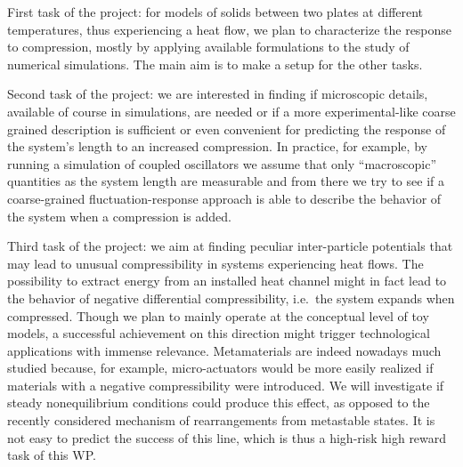 \begin{workpackage}
\begin{wpdescription}
\end{wpdescription}

\begin{tasklist}

  \begin{task}[title=TASK1,id=task1,PM=15,lead=Padova,wphases=0-12!0.5]

    First task of the project: 
    for models of solids between two plates at different temperatures, 
    thus experiencing a heat flow, we plan to characterize the response to compression, mostly by applying 
    available formulations to the study of numerical simulations. The main aim is to make a setup for the
    other tasks.
    
  \end{task}

  \begin{task}[title=TASK2,id=task2,PM=15,lead=PAR2,wphases=9-24!0.5]

    Second task of the project: 
    we are interested in finding if microscopic details, available of course in simulations, 
    are needed or if a more experimental-like coarse grained description is sufficient or even convenient for
    predicting the response of the system's length to an increased compression. In practice, for example,
    by running a simulation of coupled oscillators we assume that only ``macroscopic'' quantities as the system length
    are measurable and from there we try to see if a coarse-grained fluctuation-response approach is able to
    describe the behavior of the system when a compression is added.
    
  \end{task}

  \begin{task}[title=TASK3,id=task3,PM=15,lead=Padova,wphases=12-45!1.0]

    Third task of the project: 
    we aim at finding peculiar inter-particle potentials that may lead to unusual
    compressibility in systems experiencing heat flows. The possibility to extract energy
    from an installed heat channel might in fact lead to the behavior of negative differential compressibility,
    i.e.~the system expands when compressed. 
    Though we plan to mainly operate at the conceptual level of toy
    models, a successful achievement on this direction might trigger technological applications with immense
    relevance. Metamaterials are indeed nowadays much studied because, for example, micro-actuators would be
    more easily realized if materials with a negative compressibility were introduced. We will investigate
    if steady nonequilibrium conditions could produce this effect, as opposed to the recently considered 
    mechanism of rearrangements from metastable states. It is not easy to predict the success of this line,
    which is thus a high-risk high reward task of this WP.
    

\end{task}
\end{tasklist}
\end{workpackage}
